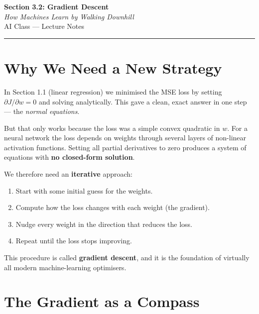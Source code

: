 \documentclass[12pt, a4paper]{article}
\newif\ifstudentmode
\theoremstyle{definition}
\begin{document}
\begin{center}
  {\LARGE \textbf{Section 3.2: Gradient Descent}} \\[0.3em]
  {\large\itshape How Machines Learn by Walking Downhill} \\[0.5em]
  {\large AI Class --- Lecture Notes}%
  \ifstudentmode
    \quad {\normalsize\color{gray}[Student Copy]}%
  \fi
\end{center}

\vspace{1em}
\hrule
\vspace{1.5em}

\section{Why We Need a New Strategy}

In Section 1.1 (linear regression) we minimised the MSE loss by setting
$\partial J/\partial w = 0$ and solving analytically.  This gave a clean,
exact answer in one step --- the \emph{normal equations}.

But that only works because the loss was a simple convex quadratic in $w$.
For a neural network the loss depends on weights through several layers of
non-linear activation functions.  Setting all partial derivatives to zero
produces a system of equations with \textbf{no closed-form solution}.

We therefore need an \textbf{iterative} approach:
\begin{enumerate}[nosep]
  \item Start with some initial guess for the weights.
  \item Compute how the loss changes with each weight (the gradient).
  \item Nudge every weight in the direction that reduces the loss.
  \item Repeat until the loss stops improving.
\end{enumerate}

This procedure is called \textbf{gradient descent}, and it is the foundation
of virtually all modern machine-learning optimisers.

\section{The Gradient as a Compass}
\end{document}
